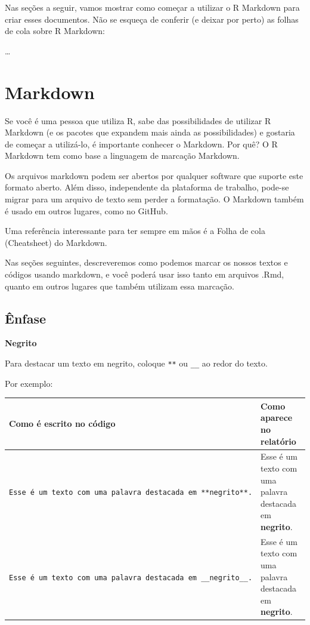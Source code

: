 \documentclass[
]{book}
\begin{document}
Nas seções a seguir, vamos mostrar como começar a utilizar o R Markdown para criar esses documentos. Não se esqueça de conferir (e deixar por perto) as folhas de cola sobre R Markdown:

\ldots{}

\section{Markdown}\label{markdown}

Se você é uma pessoa que utiliza R, sabe das possibilidades de utilizar R Markdown (e os pacotes que expandem mais ainda as possibilidades) e gostaria de começar a utilizá-lo, é importante conhecer o Markdown. Por quê? O R Markdown tem como base a linguagem de marcação Markdown.

Os arquivos markdown podem ser abertos por qualquer software que suporte este formato aberto. Além disso, independente da plataforma de trabalho, pode-se migrar para um arquivo de texto sem perder a formatação. O Markdown também é usado em outros lugares, como no GitHub.

Uma referência interessante para ter sempre em mãos é a Folha de cola (Cheatsheet) do Markdown.

Nas seções seguintes, descreveremos como podemos marcar os nossos textos e códigos usando markdown, e você poderá usar isso tanto em arquivos .Rmd, quanto em outros lugares que também utilizam essa marcação.

\subsection{Ênfase}\label{uxeanfase}

\textbf{Negrito}

Para destacar um texto em negrito, coloque \texttt{**} ou \texttt{\_\_} ao redor do texto.

Por exemplo:

\begin{longtable}[]{@{}
  >{\raggedright\arraybackslash}p{}
  >{\raggedright\arraybackslash}p{}@{}}
\toprule\noalign{}
\begin{minipage}[b]{\linewidth}\raggedright
Como é escrito no código
\end{minipage} & \begin{minipage}[b]{\linewidth}\raggedright
Como aparece no relatório
\end{minipage} \\
\midrule\noalign{}
\endhead
\bottomrule\noalign{}
\endlastfoot
\texttt{Esse\ é\ um\ texto\ com\ uma\ palavra\ destacada\ em\ **negrito**.} & Esse é um texto com uma palavra destacada em \textbf{negrito}. \\
\texttt{Esse\ é\ um\ texto\ com\ uma\ palavra\ destacada\ em\ \_\_negrito\_\_.} & Esse é um texto com uma palavra destacada em \textbf{negrito}. \\
\end{longtable}
\end{document}
